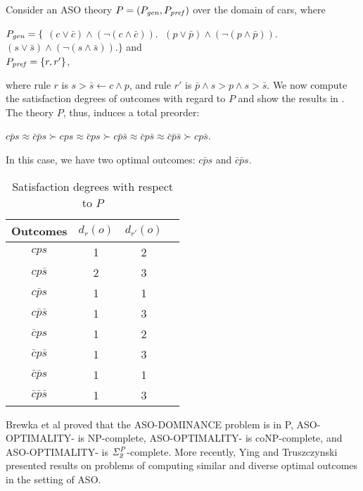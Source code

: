 Consider an ASO theory $P=(P_{\mathit{gen}}, P_{\mathit{pref}})$ over the domain 
of cars, where
\begin{center}
	$P_{\mathit{gen}}=\{$
	$(c \lor \bar{c}) \land (\neg (c \land \bar{c})). \;$
	$(p \lor \bar{p}) \land (\neg (p \land \bar{p})). \;$
	$(s \lor \bar{s}) \land (\neg (s \land \bar{s})). \}$
	and\\
	$P_{\mathit{pref}}=\{r, r'\}$,
\end{center}
where rule $r$ is $s > \bar{s} \leftarrow c \land p$, 
and rule $r'$ is $\bar{p} \land s > p \land s > \bar{s}$.
We now compute the satisfaction degrees of outcomes with regard to $P$
and show the results in .
The theory $P$, thus, induces a total preorder:
\begin{center}
	$c\bar{p}s \approx \bar{c}\bar{p}s \succ cps \approx \bar{c}ps \succ
		c\bar{p}\bar{s} \approx \bar{c}p\bar{s} \approx \bar{c}\bar{p}\bar{s} \succ
		cp\bar{s}$.
\end{center}
In this case, we have two optimal outcomes: $c\bar{p}s$ and $\bar{c}\bar{p}s$.

\begin{table}
  \centering
  \small
  \begin{tabular}{ |c||c|c|c| }
    \hline
    Outcomes                 & $d_r(o)$  & $d_{r'}(o)$ \\
    \hline \hline
    $cps$    								 & 1    & 2   \\
    \hline
    $cp\bar{s}$               & 2  & 3  \\
    \hline
    $c\bar{p} s$              & 1    & 1  \\
    \hline
    $c\bar{p}\bar{s}$          & 1  & 3    \\
    \hline
    $\bar{c} ps$              & 1  & 2    \\
    \hline
    $\bar{c} p\bar{s}$         & 1  & 3  \\
    \hline
    $\bar{c} \bar{p} s$        & 1 & 1 \\
    \hline
    $\bar{c} \bar{p} \bar{s}$   & 1  & 3   \\
    \hline
  \end{tabular}
  \caption{Satisfaction degrees with respect to $P$}
  \label{tbl:aso_ex}
\end{table}

Brewka et al \cite{Brewka03answerset} proved that
the ASO-DOMINANCE problem is in P, ASO-OPTIMALITY-
is NP-complete, ASO-OPTIMALITY- is coNP-complete,
and ASO-OPTIMALITY- is $\mathit{\Sigma^P_{2}}$-complete.
More recently, Ying and Truszczynski \cite{ZhuT13}
presented results on problems of computing similar and
diverse optimal outcomes in the setting of ASO.

